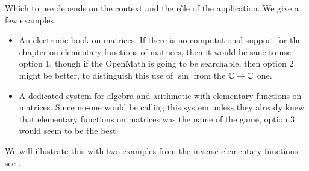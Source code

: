 \documentclass[report,keylogo]{openmath}
\begin{document}
Which to use depends on the context and the r\^ole of the application. We
give a few examples.
\begin{itemize}
\item An electronic book on matrices. If there is no computational support
for the chapter on elementary functions of matrices, then it would be sane
to use option 1, though if the OpenMath is going to be searchable, then
option 2 might be better, to distinguish this use of $\sin$ from the
$\mathbb{C}\rightarrow\mathbb{C}$ one.
\item A dedicated system for algebra and arithmetic with elementary
functions on matrices. Since no-one would be calling this system unless
they already knew that elementary functions on matrices was the name of the
game, option 3 would seem to be the best.
\end{itemize}
\label{arccot}
We will illustrate this with two examples from the inverse elementary
functions: see \cite{CDJW}.
\end{document}
